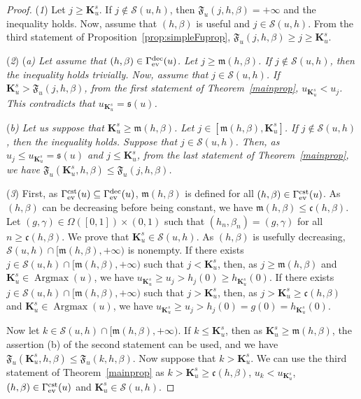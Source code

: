 \documentclass{article}
\def\valu#1{\mathfrak{s}(#1)}
\def\funset{\Gamma}
\def\fmong{\funset_{{\rm ev}}^{\rm dec}}
\def\fset{\Omega([0,1])}
\def\fcste{\funset_{{\rm ev}}^{\rm cst}}
\def\mon{\mathfrak{m}}
\def\cst{\mathfrak{c}}
\def\Fu{\mathfrak{F}_u}
\def\agmx{\operatorname{Argmax}}
\def\bigks{\mathbf{K}^s}
\def\res{\mathcal{S}}
\def\red#1{#1}
\def\blue#1{#1}
\begin{document}
	\begin{proof}
		({\itshape 1}) Let $j\geq \bigks_u$. If $j\notin \res(u,h)$, then $\Fu(j,h,\beta)=+\infty$ and the inequality holds. Now, assume that $(h,\beta)$ is useful and $j\in\res(u,h)$. From the third statement of \blue{Proposition~\ref{prop:simpleFuprop}}, $\Fu(j,h,\beta)\geq j\geq \bigks_u$. 
		
		({\itshape 2}) (\itshape{a}) Let assume that $(h,\beta)\in\fmong(u)$. Let $j\geq \mon(h,\beta)$. If $j\notin \res(u,h)$, \red{then} the inequality \red{holds trivially}. Now, assume that $j \in\res(u,h)$. If $\bigks_u>\Fu(j,h,\beta)$, from the \blue{first} statement of Theorem~\ref{mainprop}, $u_{\bigks_u}<u_j$. This contradicts that $u_{\bigks_u}=\valu{u}$.
		
		(\itshape{b}) Let us suppose that $\bigks_u\geq \mon(h,\beta)$. Let $j\in [\mon(h,\beta),\bigks_u]$. If $j\notin\res(u,h)$, \red{then} the inequality holds. Suppose that $j\in\res(u,h)$. Then, as $u_j\leq u_{\bigks_u}=\valu{u}$ and $j\leq  \bigks_u$, from the last statement of Theorem~\ref{mainprop}, we have $\Fu(\bigks_u,h,\beta)\leq \Fu(j,h,\beta)$. 
		
		({\itshape 3}) First, as $\fcste(u)\subseteq \fmong(u)$, $\mon(h,\beta)$ is defined for all $(h,\beta)\in \fcste(u)$. As $(h,\beta)$ can be decreasing before being constant, we have $\mon(h,\beta)\leq \cst(h,\beta)$. Let $(g,\gamma)\in \fset\times (0,1)$ such that $(h_n,\beta_n)=(g,\gamma)$ for all $n\geq \cst(h,\beta)$. We prove that $\bigks_u\in\res(u,h)$. As $(h,\beta)$ is usefully decreasing, 
		$\res(u,h)\cap [\mon(h,\beta),+\infty)$ is nonempty. If there exists $j\in \res(u,h)\cap [\mon(h,\beta),+\infty)$ such that $j<\bigks_u$, then, as $j\geq \mon(h,\beta)$ and $\bigks_u\in\agmx(u)$,
		we have $u_{\bigks_u}\geq u_j>h_j(0)\geq h_{\bigks_u}(0)$. If there exists $j\in \res(u,h)\cap [\mon(h,\beta),+\infty)$ such that $j>\bigks_u$, then, as $j>\bigks_u\geq \cst(h,\beta)$ and $\bigks_u\in\agmx(u)$, we have $u_{\bigks_u} \geq u_j>h_j(0)=g(0)=h_{\bigks_u}(0)$. 
		
		Now let $k\in\res(u,h)\cap [\mon(h,\beta),+\infty)$. If $k\leq \bigks_u$, then as $\bigks_u\geq \mon(h,\beta)$, the assertion (b) of the second statement can be used, and we have  $\Fu(\bigks_u,h,\beta)\leq \Fu(k,h,\beta)$. Now suppose that $k>\bigks_u$. We can use the \blue{third} statement of Theorem~\ref{mainprop} as $k>\bigks_u\geq \cst(h,\beta)$, $u_k< u_{\bigks_u}$, $(h,\beta)\in\fcste(u)$ and $\bigks_u\in \res(u,h)$.   
	\end{proof}
	
\end{document}
